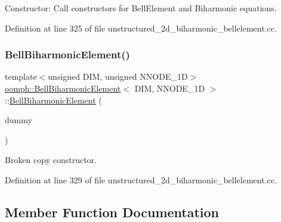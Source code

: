 Constructor\+: Call constructors for Bell\+Element and Biharmonic equations. 



Definition at line 325 of file unstructured\+\_\+2d\+\_\+biharmonic\+\_\+bellelement.\+cc.

\mbox{\label{classoomph_1_1BellBiharmonicElement_a7fc1038d4814433b0b9e998958309ce5}} 
\subsubsection{\texorpdfstring{Bell\+Biharmonic\+Element()}{BellBiharmonicElement()}\hspace{0.1cm}{\footnotesize\ttfamily [2/2]}}
{\footnotesize\ttfamily template$<$unsigned D\+IM, unsigned N\+N\+O\+D\+E\+\_\+1D$>$ \\
\hyperlink{classoomph_1_1BellBiharmonicElement}{oomph\+::\+Bell\+Biharmonic\+Element}$<$ D\+IM, N\+N\+O\+D\+E\+\_\+1D $>$\+::\hyperlink{classoomph_1_1BellBiharmonicElement}{Bell\+Biharmonic\+Element} (\begin{DoxyParamCaption}\item[{const \hyperlink{classoomph_1_1BellBiharmonicElement}{Bell\+Biharmonic\+Element}$<$ D\+IM, N\+N\+O\+D\+E\+\_\+1D $>$ \&}]{dummy }\end{DoxyParamCaption})\hspace{0.3cm}{\ttfamily [inline]}}



Broken copy constructor. 



Definition at line 329 of file unstructured\+\_\+2d\+\_\+biharmonic\+\_\+bellelement.\+cc.



\subsection{Member Function Documentation}
\mbox{\label{classoomph_1_1BellBiharmonicElement_aceea1798272378f0402ef0e0f324ff3b}} 
